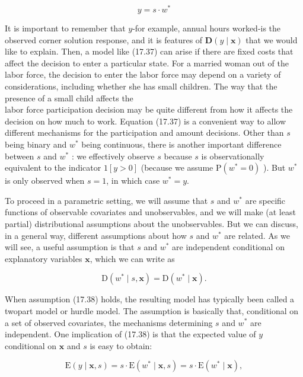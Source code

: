 \documentclass[10pt]{article}
\begin{document}
\begin{equation*}
y=s \cdot w^{*} \tag{17.37}
\end{equation*}


It is important to remember that $y$-for example, annual hours worked-is the observed corner solution response, and it is features of $\mathbf{D}(y \mid \mathbf{x})$ that we would like to explain. Then, a model like (17.37) can arise if there are fixed costs that affect the decision to enter a particular state. For a married woman out of the labor force, the decision to enter the labor force may depend on a variety of considerations, including whether she has small children. The way that the presence of a small child affects the\\
labor force participation decision may be quite different from how it affects the decision on how much to work. Equation (17.37) is a convenient way to allow different mechanisms for the participation and amount decisions. Other than $s$ being binary and $w^{*}$ being continuous, there is another important difference between $s$ and $w^{*}$ : we effectively observe $s$ because $s$ is observationally equivalent to the indicator $1[y>0]$ (because we assume $\mathrm{P}\left(w^{*}=0\right)$ ). But $w^{*}$ is only observed when $s=1$, in which case $w^{*}=y$.

To proceed in a parametric setting, we will assume that $s$ and $w^{*}$ are specific functions of observable covariates and unobservables, and we will make (at least partial) distributional assumptions about the unobservables. But we can discuss, in a general way, different assumptions about how $s$ and $w^{*}$ are related. As we will see, a useful assumption is that $s$ and $w^{*}$ are independent conditional on explanatory variables $\mathbf{x}$, which we can write as


\begin{equation*}
\mathrm{D}\left(w^{*} \mid s, \mathbf{x}\right)=\mathrm{D}\left(w^{*} \mid \mathbf{x}\right) . \tag{17.38}
\end{equation*}


When assumption (17.38) holds, the resulting model has typically been called a twopart model or hurdle model. The assumption is basically that, conditional on a set of observed covariates, the mechanisms determining $s$ and $w^{*}$ are independent. One implication of (17.38) is that the expected value of $y$ conditional on $\mathbf{x}$ and $s$ is easy to obtain:


\begin{equation*}
\mathrm{E}(y \mid \mathbf{x}, s)=s \cdot \mathrm{E}\left(w^{*} \mid \mathbf{x}, s\right)=s \cdot \mathrm{E}\left(w^{*} \mid \mathbf{x}\right), \tag{17.39}
\end{equation*}
\end{document}
